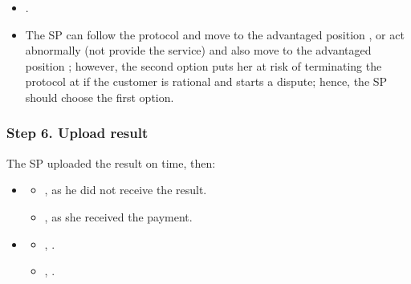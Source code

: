 \documentclass[pdftex,twocolumn,epjc3]{svjour3}
\begin{document}
{\Fairness
\newcommand{\SPCanDoBothButFollowIsSafe}[1]{The SP can follow the protocol and move to the advantaged position \Pos{#1}{s}{\normal}{\plus}, or act abnormally (not provide the service) and also move to the advantaged position \Pos{#1}{s}{\abnormal}{\plus}; however, the second option puts her at risk of terminating the protocol at \Pos{#1}{s}{\abdispute}{\minus} if the customer is rational and starts a dispute; hence, the SP should choose the first option}

\begin{itemize}
  \item {}.
  \item \SPCanDoBothButFollowIsSafe{5}.
\end{itemize}

\subsubsection*{Step 6. \SPTurn{} Upload result}\label{step-6-publication-of-results}

The SP uploaded the result on time, then:

\begin{itemize}
\item \AgreeablePath
  \begin{itemize}
    \item {},  as he did not receive the result.
    \item {},  as she received the payment.
  \end{itemize}
\item \DisputePath
  \begin{itemize}
    \item {}, \CustomerLosesBeforePoP{}.
    \item {}, .

  \end{itemize}
\end{itemize}

\ActedAbnormallyThen{\sp}

}
\end{document}
